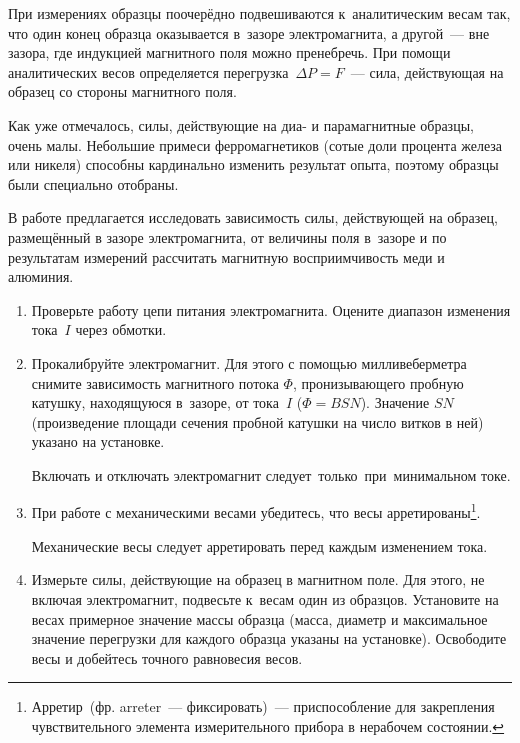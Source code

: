 При измерениях образцы поочерёдно подвешиваются к~аналитическим весам так, что
один конец образца оказывается в~зазоре электромагнита, а другой~--- вне зазора,
где индукцией магнитного поля можно пренебречь. При помощи аналитических весов
определяется перегрузка~$\Delta P=F$~--- сила, действующая на образец со стороны
магнитного поля.

Как уже отмечалось, силы, действующие на диа- и парамагнитные образцы, очень
малы. Небольшие примеси ферромагнетиков (сотые доли процента железа или никеля)
способны кардинально изменить результат опыта, поэтому образцы были специально
отобраны.

\begin{lab:task}

В работе предлагается исследовать зависимость силы, действующей на образец,
размещённый в зазоре электромагнита, от
величины поля в~зазоре и по результатам измерений рассчитать магнитную
восприимчивость меди и алюминия.

\begin{enumerate}

\item Проверьте работу цепи питания электромагнита. Оцените диапазон изменения
тока~$I$ через обмотки.

\item Прокалибруйте электромагнит. Для этого с помощью милливеберметра снимите
зависимость магнитного потока $\Phi$,
пронизывающего пробную катушку, находящуюся в~зазоре, от тока~$I$ ($\Phi=BSN$).
Значение $SN$ (произведение площади
сечения пробной катушки на число витков в ней) указано на установке.

\begin{lab:warning}
Включать и отключать электромагнит следует~только~при~минимальном токе.
\end{lab:warning}

\item При работе с механическими весами убедитесь,
что весы арретированы\footnote{Арретир~(фр. arreter~---
фиксировать)~--- приспособление для закрепления
чувствительного элемента измерительного прибора в нерабочем состоянии.}.

\begin{lab:warning}
Механические весы следует арретировать перед каждым изменением тока.
\end{lab:warning}

\item \label{item:4} Измерьте силы, действующие на образец в магнитном поле. Для
этого, не включая электромагнит, подвесьте к~весам
один из образцов. Установите на весах примерное значение массы образца (масса,
диаметр и максимальное значение
перегрузки для каждого образца указаны на установке). Освободите весы и
добейтесь точного равновесия весов.


\end{enumerate}
\end{lab:task}
